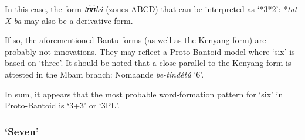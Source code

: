 In this case, the form \textit{t{\'{ʊ}}{\'{ʊ}}bá} (zones ABCD) that can be interpreted as ‘*3*2’: *\textit{tat-X-ba} may also be a derivative form.  

If so, the aforementioned Bantu forms (as well as the Kenyang form) are probably not innovations. They may reflect a Proto-Bantoid model where `six' is based on `three'. It should be noted that a close parallel to the Kenyang form is attested in the Mbam branch: Nomaande \textit{be-tíndét{\'{u}}} ‘6’.

In sum, it appears that the most probable word-formation pattern for `six' in Proto-Bantoid is ‘3+3’ or ‘3PL’.

 
\subsubsection{`Seven'}\label{sec:3.1.1.5}
